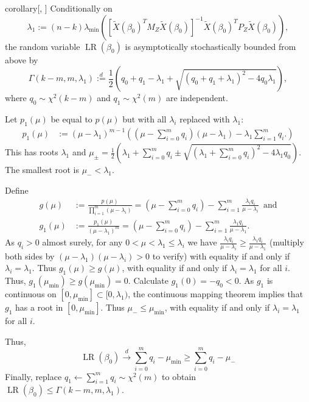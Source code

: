 \documentclass[11pt,hidelinks,a4paper]{article}
\DeclareMathOperator{\LR}{LR}
\newcommand{\tod}{\overset{d}{\to}}
\let\leq\leqslant
\let\geq\geqslant
\begin{document}
\begin{theoremEnd}[one big link translated={\hspace{-0.71cm} See proof on page}]{corollary}[\citeauthor{kleibergen2007generalizing}, \citeyear{kleibergen2007generalizing}]
    \label{cor:2}
    Conditionally on
    $$\lambda_1 := (n - k) \lambda_\mathrm{min}\left(\left[ \tilde X(\beta_0)^T M_Z \tilde X(\beta_0) \right]^{-1} \tilde X(\beta_0)^T P_Z \tilde X(\beta_0) \right),$$
    the random variable $\LR(\beta_0)$ is asymptotically stochastically bounded from above by
    $$\Gamma(k - m, m, \lambda_1) \overset{d}{:=} \frac{1}{2} \left(q_0 + q_1 - \lambda_1 + \sqrt{ \left(q_0 + q_1 + \lambda_1 \right)^2 - 4 q_0 \lambda_1} \right),$$
    where $q_0 \sim \chi^2(k - m)$ and $q_1 \sim \chi^2(m)$ are independent.
\end{theoremEnd}
\begin{proofEnd}
    Let $p_1(\mu)$ be equal to $p(\mu)$ but with all $\lambda_i$ replaced with $\lambda_1$:
    \begin{align*}
    p_1(\mu) &:=  (\mu - \lambda_1)^{m-1} \left( (\mu - \sum_{i=0}^m q_i) (\mu - \lambda_1) - \lambda_1 \sum_{i = 1}^m q_i.
    \right) %
    \end{align*}
    This has roots $\lambda_1$ and $\mu_\pm = \frac{1}{2} \left(\lambda_1 + \sum_{i=0}^m q_i \pm \sqrt{(\lambda_1 + \sum_{i=0}^m q_i)^2 - 4 \lambda_1 q_0} \right)$.
    The smallest root is $\mu_- < \lambda_1$.

    Define
    \begin{align*}
    g(\mu) &:= \frac{p(\mu)}{\prod_{i=1}^m (\mu - \lambda_i)} = (\mu - \sum_{i=0}^m q_i) - \sum_{i=1}^m \frac{\lambda_i q_i}{\mu - \lambda_i} \, \text{ and} \\
    g_1(\mu) &:= \frac{p_1(\mu)}{(\mu - \lambda_1)^{m}} = (\mu - \sum_{i=0}^m q_i) - \sum_{i=1}^m \frac{\lambda_1 q_i}{\mu - \lambda_1}.
    \end{align*}
    As $q_i > 0$ almost surely, for any $0 < \mu < \lambda_1 \leq \lambda_i$ we have $\frac{\lambda_i q_i}{\mu - \lambda_i} \geq \frac{\lambda_1 q_i}{\mu - \lambda_1}$ (multiply both sides by $(\mu - \lambda_1) (\mu - \lambda_i) > 0$ to verify) with equality if and only if $\lambda_i = \lambda_1$.
    Thus $g_1(\mu) \geq g(\mu)$, with equality if and only if $\lambda_i = \lambda_1$ for all $i$.
    Thus, $ g_1(\mu_\mathrm{min}) \geq g(\mu_\mathrm{min}) = 0$.
    Calculate $g_1(0) = - q_0 < 0$.
    As $g_1$ is continuous on $[0, \mu_\mathrm{min}] \subset [0, \lambda_1)$, the continuous mapping theorem implies that $g_1$ has a root in $[0, \mu_\mathrm{min}]$.
    Thus $\mu_- \leq \mu_\mathrm{min}$, with equality if and only if $\lambda_i = \lambda_1$ for all $i$.

    Thus,
    $$
    \LR(\beta_0) \tod \sum_{i=0}^m q_i - \mu_\mathrm{min} \geq \sum_{i=0}^m q_i - \mu_-
    $$
    Finally, replace $q_1 \leftarrow \sum_{i=1}^m q_i \sim \chi^2(m)$ to obtain $\LR(\beta_0) \leq \Gamma(k - m, m, \lambda_1)$.
\end{proofEnd}
\end{document}
